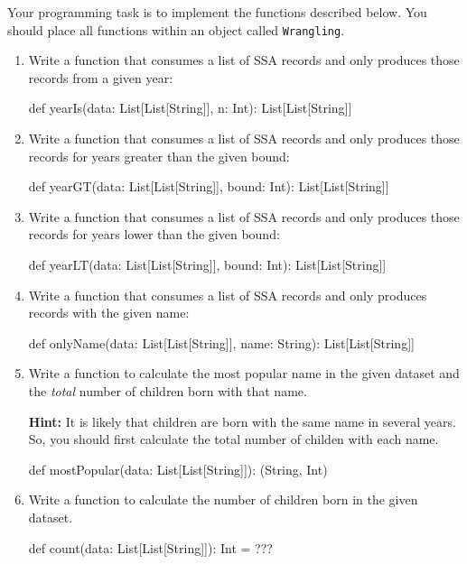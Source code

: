 Your programming task is to implement the functions described below.
You should place all functions within an object called \texttt{Wrangling}.

\begin{enumerate}

  \item Write a function that consumes a list of SSA records and only produces
  those records from a given year:
  \begin{scalacode}
  def yearIs(data: List[List[String]], n: Int): List[List[String]]
  \end{scalacode}


  \item Write a function that consumes a list of SSA records and only produces
  those records for years greater than the given bound:
  \begin{scalacode}
  def yearGT(data: List[List[String]], bound: Int): List[List[String]]
  \end{scalacode}

  \item Write a function that consumes a list of SSA records and only produces
  those records for years lower than the given bound:
  \begin{scalacode}
  def yearLT(data: List[List[String]], bound: Int): List[List[String]]
  \end{scalacode}

  \item Write a function that consumes a list of SSA records and only produces
  records with the given name:
  \begin{scalacode}
  def onlyName(data: List[List[String]], name: String): List[List[String]]
  \end{scalacode}

  \item Write a function to calculate the most popular name in the given dataset
  and the \emph{total} number of children born with that name.

  \textbf{Hint:} It is likely that children are born with the same
      name in several years. So, you should first calculate the total
      number of childen with each name.
  
  \begin{scalacode}
  def mostPopular(data: List[List[String]]): (String, Int)
  \end{scalacode}

  \item Write a function to calculate the number of children born in the given dataset.
  \begin{scalacode}
  def count(data: List[List[String]]): Int = ???
  \end{scalacode}


\end{enumerate}
